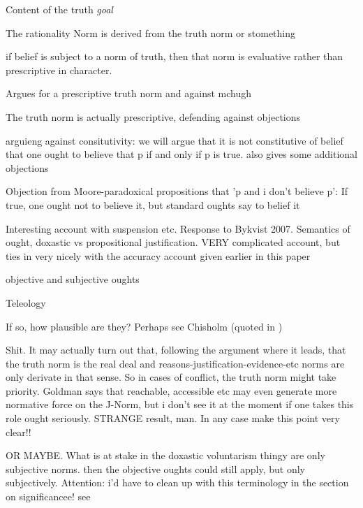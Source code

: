 \documentclass[12pt,numbers=noenddot]{scrartcl}
\begin{document}
\textcite{David2001-DAVTAT-7}
Content of the truth \emph{goal}

\textcite[101]{Boghossian2008-BOGCAJ}
The rationality Norm is derived from the truth norm or stomething

\textcite{Mchugh2012-MCHTTN}
if belief is subject to a norm of truth, then that norm is evaluative rather than prescriptive in character.

\textcite{Greenberg2016-GREITN}
Argues for a prescriptive truth norm and against mchugh

\textcite{Whiting2013-WHITTA-3}
The truth norm is actually prescriptive, defending against objections

\textcite{Bykvist2007-BYKDTI}
arguieng against consitutivity: we will argue that it is not constitutive of belief that one ought to believe that p if and only if p is true.
also gives some additional objections

Objection from Moore-paradoxical propositions that 'p and i don't believe p': If true, one ought not to believe it, but standard oughts say to belief it

\textcite{Wedgwood2013-WEDTRT}
Interesting account with suspension etc. Response to Bykvist 2007. Semantics of ought, doxastic vs propositional justification. VERY complicated account, but ties in very nicely with the accuracy account given earlier in this paper

objective and subjective oughts
\textcite{Gibbard2005-GIBTAC} 
\textcite{Wedgwood2016-WEDOAS}
\textcite[Ch. 2]{Gibbons2013-GIBTNO}

Teleology
\textcite[Ch. 5]{Gibbons2013-GIBTNO}

If so, how plausible are they? Perhaps see Chisholm (quoted in \textcite{Goldman2002-GOLTUO-2})


Shit. It may actually turn out that, following the argument where it leads, that the truth norm is the real deal and reasons-justification-evidence-etc norms are only derivate in that sense. So in cases of conflict, the truth norm might take priority. Goldman says that reachable, accessible etc may even generate more normative force on the J-Norm, but i don't see it at the moment if one takes this role ought seriously. STRANGE result, man. In any case make this point very clear!!

OR MAYBE. What is at stake in the doxastic voluntarism thingy are only subjective norms. then the objective oughts could still apply, but only subjectively. Attention: i'd have to clean up with this terminology in the section on significancee! see 
\end{document}
